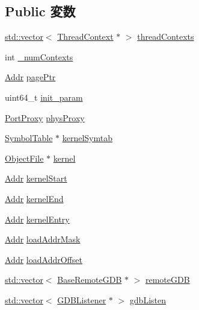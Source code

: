 \subsection*{Public 変数}
\begin{DoxyCompactItemize}
\item 
\hyperlink{classstd_1_1vector}{std::vector}$<$ \hyperlink{classThreadContext}{ThreadContext} $\ast$ $>$ \hyperlink{classSystem_a19840a204c4d6f67b45a07073e8b41df}{threadContexts}
\item 
int \hyperlink{classSystem_a13d38579137b1a8b8a2fcfdd501f8d4a}{\_\-numContexts}
\item 
\hyperlink{base_2types_8hh_af1bb03d6a4ee096394a6749f0a169232}{Addr} \hyperlink{classSystem_aeeee662e637858aeeb38ca8b84a115cb}{pagePtr}
\item 
uint64\_\-t \hyperlink{classSystem_aebfcbf904f5dc098c119f45063661dce}{init\_\-param}
\item 
\hyperlink{classPortProxy}{PortProxy} \hyperlink{classSystem_a6219b40ecb92ec67602ae32c1ae2c0d6}{physProxy}
\item 
\hyperlink{classSymbolTable}{SymbolTable} $\ast$ \hyperlink{classSystem_a579bef006c1d6148c2764355c0b039b7}{kernelSymtab}
\item 
\hyperlink{classObjectFile}{ObjectFile} $\ast$ \hyperlink{classSystem_ab5c2cc90b7ed9b57e9d9c6ce42a5200b}{kernel}
\item 
\hyperlink{base_2types_8hh_af1bb03d6a4ee096394a6749f0a169232}{Addr} \hyperlink{classSystem_ab7de1b59ae9f13ebe06ee0fdaf262505}{kernelStart}
\item 
\hyperlink{base_2types_8hh_af1bb03d6a4ee096394a6749f0a169232}{Addr} \hyperlink{classSystem_ab50e277f319055cb4e9d05e09e314b4a}{kernelEnd}
\item 
\hyperlink{base_2types_8hh_af1bb03d6a4ee096394a6749f0a169232}{Addr} \hyperlink{classSystem_aa4fb57a8e8cf6890a99606f31841c74f}{kernelEntry}
\item 
\hyperlink{base_2types_8hh_af1bb03d6a4ee096394a6749f0a169232}{Addr} \hyperlink{classSystem_a49e011922eb3cd15a03e61e206bf02d3}{loadAddrMask}
\item 
\hyperlink{base_2types_8hh_af1bb03d6a4ee096394a6749f0a169232}{Addr} \hyperlink{classSystem_a23e95dade560d359d40e4e98456279ad}{loadAddrOffset}
\item 
\hyperlink{classstd_1_1vector}{std::vector}$<$ \hyperlink{classBaseRemoteGDB}{BaseRemoteGDB} $\ast$ $>$ \hyperlink{classSystem_a0bb92fde095f717f1a9709fa16825091}{remoteGDB}
\item 
\hyperlink{classstd_1_1vector}{std::vector}$<$ \hyperlink{classGDBListener}{GDBListener} $\ast$ $>$ \hyperlink{classSystem_a258d0d6139d48d76bf8bdda04f6e2ef8}{gdbListen}

\end{DoxyCompactItemize}
